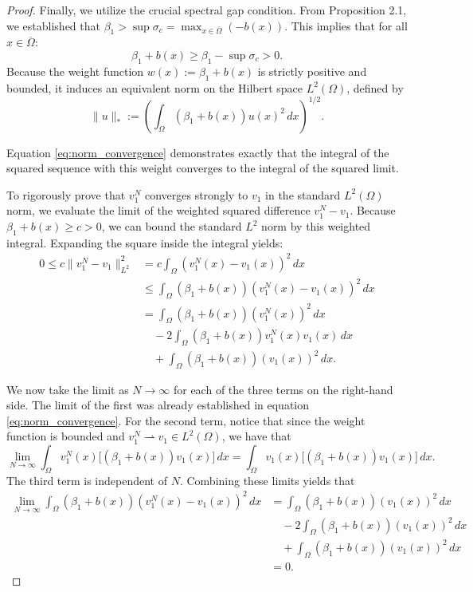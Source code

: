 \documentclass[10pt,a4paper]{amsart}
\begin{document}
\begin{proof}
    Finally, we utilize the crucial spectral gap condition. From Proposition 2.1, we established that $\beta_1 > \sup \sigma_c = \max_{x \in \overline{\Omega}} (-b(x))$. This implies that for all $x \in \overline{\Omega}$:
    \begin{equation}
        \beta_1 + b(x) \geq \beta_1 - \sup \sigma_c > 0.
    \end{equation}
    Because the weight function $w(x) := \beta_1 + b(x)$ is strictly positive and bounded, it induces an equivalent norm on the Hilbert space $L^2(\Omega)$, defined by
    \begin{equation}
        \|u\|_{*} := \left( \int_\Omega (\beta_1 + b(x)) u(x)^2 \, dx \right)^{1/2}.
    \end{equation}
    
    Equation \eqref{eq:norm_convergence} demonstrates exactly that the integral of the squared sequence with this weight converges to the integral of the squared limit. 
    
    To rigorously prove that $v_1^N$ converges strongly to $v_1$ in the standard $L^2(\Omega)$ norm, we evaluate the limit of the weighted squared difference $v_1^N - v_1$. Because $\beta_1 + b(x) \geq c > 0$, we can bound the standard $L^2$ norm by this weighted integral. Expanding the square inside the integral yields:
    \begin{align}
        0 \leq c \|v_1^N - v_1\|_{L^2}^2 &= c \int_\Omega (v_1^N(x) - v_1(x))^2 \, dx \nonumber \\
        &\leq \int_\Omega (\beta_1 + b(x))(v_1^N(x) - v_1(x))^2 \, dx \nonumber \\
        &= \int_\Omega (\beta_1 + b(x))(v_1^N(x))^2 \, dx \nonumber \\
        &\quad - 2 \int_\Omega (\beta_1 + b(x))v_1^N(x)v_1(x) \, dx \nonumber \\
        &\quad + \int_\Omega (\beta_1 + b(x))(v_1(x))^2 \, dx.
    \end{align}
    
    We now take the limit as $N \to \infty$ for each of the three terms on the right-hand side. The limit of the first was already established in equation \eqref{eq:norm_convergence}. For the second term, notice that since the weight function is bounded  and $v_1^N \rightharpoonup v_1 \in L^2(\Omega)$, we have that
    \begin{equation}
        \lim_{N \to \infty} \int_\Omega v_1^N(x) \big[ (\beta_1 + b(x)) v_1(x) \big] \, dx = \int_\Omega v_1(x) \big[ (\beta_1 + b(x)) v_1(x) \big] \, dx.
    \end{equation}
    The third term is independent of $N$. Combining these limits yields that
    \begin{align}
        \lim_{N \to \infty} \int_\Omega (\beta_1 + b(x))(v_1^N(x) - v_1(x))^2 \, dx 
        &= \int_\Omega (\beta_1 + b(x))(v_1(x))^2 \, dx \nonumber \\
        &\quad - 2 \int_\Omega (\beta_1 + b(x))(v_1(x))^2 \, dx \nonumber \\
        &\quad + \int_\Omega (\beta_1 + b(x))(v_1(x))^2 \, dx \nonumber \\
        &= 0.
    \end{align}
    

\end{proof}
\end{document}
